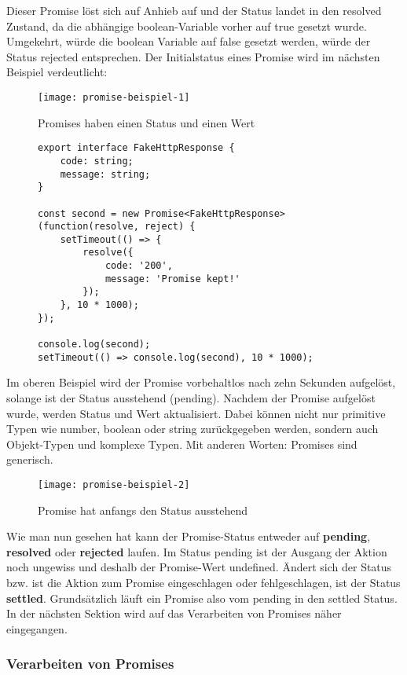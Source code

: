 \noindent
Dieser Promise löst sich auf Anhieb auf und der Status landet in den resolved Zustand, da die abhängige boolean-Variable vorher auf true gesetzt wurde. Umgekehrt, würde die boolean Variable auf false gesetzt werden, würde der Status rejected entsprechen. Der Initialstatus eines Promise wird im nächsten Beispiel verdeutlicht:

\begin{figure}[H]
\centering
\texttt{[image: promise-beispiel-1]}
\caption{Promises haben einen Status und einen Wert}
\end{figure}

\begin{figure}[H]
\begin{lstlisting}
export interface FakeHttpResponse {
    code: string;
    message: string;
}

const second = new Promise<FakeHttpResponse>(function(resolve, reject) {
    setTimeout(() => {
        resolve({
            code: '200',
            message: 'Promise kept!'
        });
    }, 10 * 1000);
});

console.log(second);
setTimeout(() => console.log(second), 10 * 1000);
\end{lstlisting}
\end{figure}

\noindent
Im oberen Beispiel wird der Promise vorbehaltlos nach zehn Sekunden aufgelöst, solange ist der Status ausstehend (pending). Nachdem der Promise aufgelöst wurde, werden Status und Wert aktualisiert. Dabei können nicht nur primitive Typen wie number, boolean oder string zurückgegeben werden, sondern auch Objekt-Typen und komplexe Typen. Mit anderen Worten: Promises sind generisch.

\begin{figure}[H]
\centering
\texttt{[image: promise-beispiel-2]}
\caption{Promise hat anfangs den Status \glqq{}ausstehend\grqq{}}
\end{figure}

\noindent
Wie man nun gesehen hat kann der Promise-Status entweder auf \textbf{pending}, \textbf{resolved} oder \textbf{rejected} laufen. Im Status pending ist der Ausgang der Aktion noch ungewiss und deshalb der Promise-Wert undefined. Ändert sich der Status bzw. ist die Aktion zum Promise eingeschlagen oder fehlgeschlagen, ist der Status \textbf{settled}. Grundsätzlich läuft ein Promise also vom pending in den settled Status. In der nächsten Sektion wird auf das Verarbeiten von Promises näher eingegangen.

\subsubsection{Verarbeiten von Promises}

